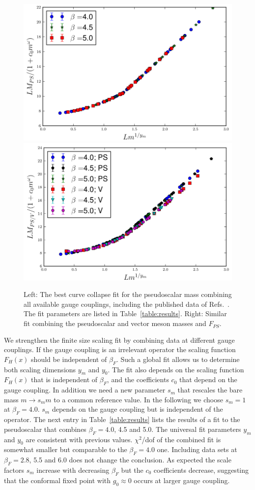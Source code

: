 \documentclass[prl, letterpaper, amsmath, amssymb, preprintnumbers, showpacs, superscriptaddress, twocolumn]{revtex4-1}
\newcommand{\be}{\ensuremath{\beta} }
\begin{document}
\begin{figure}[tbp]
\centering
  \includegraphics[width=0.45\linewidth]{pion_combined}\hfill
  \includegraphics[width=0.45\linewidth]{rho_combined}
  \caption{\label{fig:fss_combined} Left: The best curve collapse fit for the pseudoscalar mass combining  all available gauge couplings, including the published data of Refs.~\protect\cite{Fodor:2011tu,Aoki:2012eq}.  The fit parameters are listed in Table~\protect\ref{table:results}.  Right: Similar fit combining the pseudoscalar and vector meson masses and $F_{PS}$.}
\end{figure}

We strengthen the finite size scaling fit by combining data at different gauge couplings.
If the gauge coupling is an irrelevant operator the scaling function $F_H(x)$ should be independent of $\beta_F$.
Such a global fit allows us to determine both scaling dimensions $y_m$ and $y_0$.
The fit also depends on the scaling function $F_H(x)$ that is independent of $\be_F$, and the coefficients $c_0$ that depend on the gauge coupling.
In addition we need a new parameter $s_m$ that rescales the bare mass $m \to s_m m$ to a common reference value.
In the following we choose $s_m=1$ at $\beta_F=4.0$.
$s_m$ depends on the gauge coupling but is independent of the operator.
The next entry in Table~\ref{table:results} lists the results of a fit to the pseudoscalar that combines $\beta_F=4.0$, 4.5 and 5.0.
The universal fit parameters $y_m$ and $y_0$ are consistent with previous values.
$\chi^2$/dof of the combined fit is somewhat smaller but comparable to the $\be_F = 4.0$ one.
Including data sets at $\beta_F=2.8$, 5.5 and 6.0 does not change the conclusion.
As expected the scale factors $s_m$ increase with decreasing $\be_F$ but the $c_0$ coefficients decrease, suggesting that the conformal fixed point with $g_0 \approx 0$ occurs at larger gauge coupling.
\end{document}
